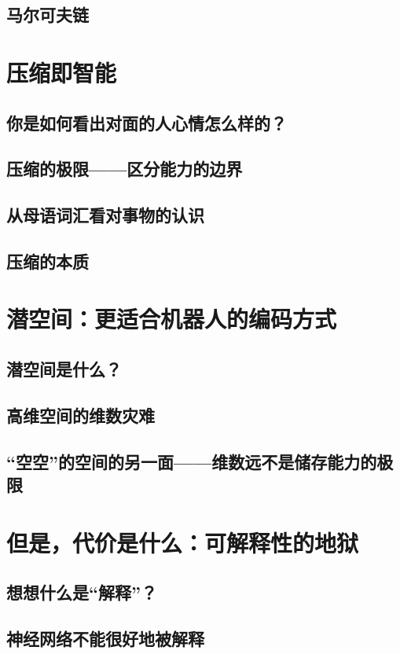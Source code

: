\documentclass[UTF8, 12pt]{article}
\begin{document}
\subsection{马尔可夫链}

\section{压缩即智能}
\subsection{你是如何看出对面的人心情怎么样的？}
\subsection{压缩的极限——区分能力的边界}
\subsection{从母语词汇看对事物的认识}
\subsection{压缩的本质}

\section{潜空间：更适合机器人的编码方式}
\subsection{潜空间是什么？}
\subsection{高维空间的维数灾难}
\subsection{“空空”的空间的另一面——维数远不是储存能力的极限}

\section{但是，代价是什么：可解释性的地狱}
\subsection{想想什么是“解释”？}
\subsection{神经网络不能很好地被解释}
\end{document}
